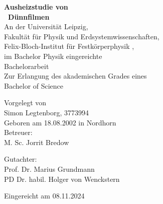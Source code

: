 \begin{titlepage}
    \begin{center}
        \vfill
        \Huge
        \textbf{Ausheizstudie von \\
        \heo\ Dünnfilmen} \\

        \vfill
        \Large
        An der Universität Leipzig, \\
        Fakultät für Physik und Erdsystemwissenschaften, \\
        Felix-Bloch-Institut für Festkörperphysik , \\
        im Bachelor Physik eingereichte \\

        \vfill
        \Huge
        Bachelorarbeit\\

        \vfill
        \Large
        Zur Erlangung des akademischen Grades eines \\
        Bachelor of Science

        \vfill
        Vorgelegt von \\
        Simon Legtenborg, 3773994 \\
        Geboren am 18.08.2002 in Nordhorn \\


        \vfill
        Betreuer: \\
        M. Sc. Jorrit Bredow

        \vfill
        Gutachter: \\
        Prof. Dr. Marius Grundmann \\
        PD Dr. habil. Holger von Wenckstern


        \vfill
        Eingereicht am 08.11.2024
        \vfill


    \end{center}
\end{titlepage}
